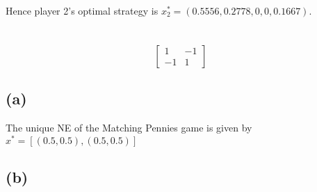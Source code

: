\documentclass[11pt]{article}
\begin{document}
Hence player 2's optimal strategy is $x^*_2 = (0.5556,0.2778,0,0,0.1667)$.

\section{}

\begin{equation}
  \begin{bmatrix}
    1 & -1 \\
    -1 & 1
  \end{bmatrix}
\end{equation}

\subsection*{(a)}

The unique NE of the Matching Pennies game is given by $x^* = [(0.5,0.5),(0.5,0.5)]$

\subsection*{(b)}
\end{document}
